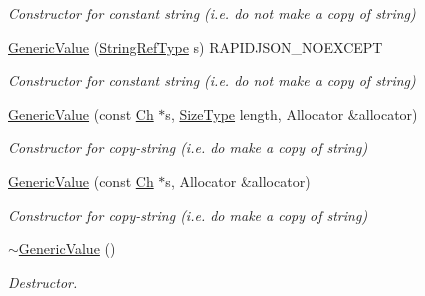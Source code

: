 \begin{DoxyCompactItemize}
\begin{DoxyCompactList}\small\item\em Constructor for constant string (i.\+e. do not make a copy of string) \end{DoxyCompactList}\item 
\hyperlink{class_generic_value_abb2887958974fef1b2b5c8e32cc72ddb}{Generic\+Value} (\hyperlink{class_generic_value_a32e0f30ee278072374c8168b14d3317f}{String\+Ref\+Type} s) R\+A\+P\+I\+D\+J\+S\+O\+N\+\_\+\+N\+O\+E\+X\+C\+E\+PT\hypertarget{class_generic_value_abb2887958974fef1b2b5c8e32cc72ddb}{}\label{class_generic_value_abb2887958974fef1b2b5c8e32cc72ddb}

\begin{DoxyCompactList}\small\item\em Constructor for constant string (i.\+e. do not make a copy of string) \end{DoxyCompactList}\item 
\hyperlink{class_generic_value_a9ec2c7cda8c8845acfa3565c6b1b4e10}{Generic\+Value} (const \hyperlink{class_generic_value_ade0e0ce64ccd5d852da57a35e720bafb}{Ch} $\ast$s, \hyperlink{rapidjson_8h_a5ed6e6e67250fadbd041127e6386dcb5}{Size\+Type} length, Allocator \&allocator)\hypertarget{class_generic_value_a9ec2c7cda8c8845acfa3565c6b1b4e10}{}\label{class_generic_value_a9ec2c7cda8c8845acfa3565c6b1b4e10}

\begin{DoxyCompactList}\small\item\em Constructor for copy-\/string (i.\+e. do make a copy of string) \end{DoxyCompactList}\item 
\hyperlink{class_generic_value_a9b72b2e3347d4cd77b16c3b45e8decf1}{Generic\+Value} (const \hyperlink{class_generic_value_ade0e0ce64ccd5d852da57a35e720bafb}{Ch} $\ast$s, Allocator \&allocator)\hypertarget{class_generic_value_a9b72b2e3347d4cd77b16c3b45e8decf1}{}\label{class_generic_value_a9b72b2e3347d4cd77b16c3b45e8decf1}

\begin{DoxyCompactList}\small\item\em Constructor for copy-\/string (i.\+e. do make a copy of string) \end{DoxyCompactList}\item 
\hyperlink{class_generic_value_a213ba89ef5ef961a5e655bd8c78ac9f4}{$\sim$\+Generic\+Value} ()
\begin{DoxyCompactList}\small\item\em Destructor. \end{DoxyCompactList}\end{DoxyCompactItemize}


